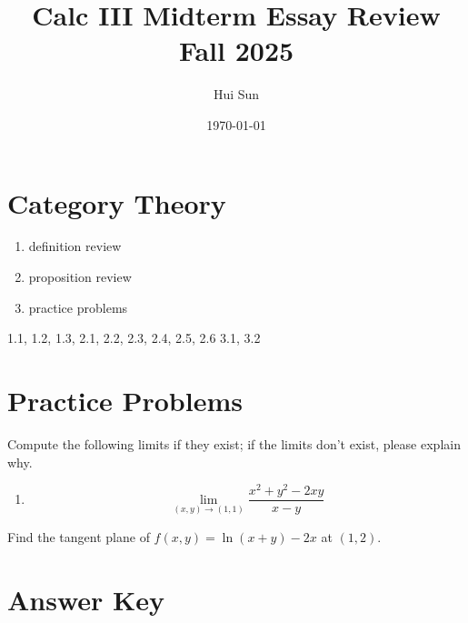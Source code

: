 \documentclass[openany]{book}
\title{Calc III Midterm Essay Review
\\ 
\vspace{0.4cm}
\large Fall 2025}
\date{\today}
\author{Hui Sun}
\begin{document}
\maketitle

\tableofcontents
\newpage

\chapter{Category Theory}

\begin{enumerate}
    \item definition review 
    \item proposition review
    \item practice problems
\end{enumerate}



1.1, 1.2, 1.3, 
2.1, 2.2, 2.3, 2.4, 2.5, 2.6
3.1, 3.2


\chapter{Practice Problems}

\begin{prob}
    Compute the following limits if they exist; if the limits don't exist, please explain why.
    \begin{enumerate}
        \item \begin{equation*}
            \lim_{(x,y)\to(1,1)}\frac{x^2+y^2-2xy}{x-y}
        \end{equation*}
    \end{enumerate}
\end{prob}

\begin{prob}
    Find the tangent plane of $f(x,y)=\ln(x+y)-2x$ at $(1,2)$.
\end{prob}


\begin{prob}
    
\end{prob}



\chapter{Answer Key}



\renewcommand\thesection{\arabic{section}}

\noindent
\end{document}
